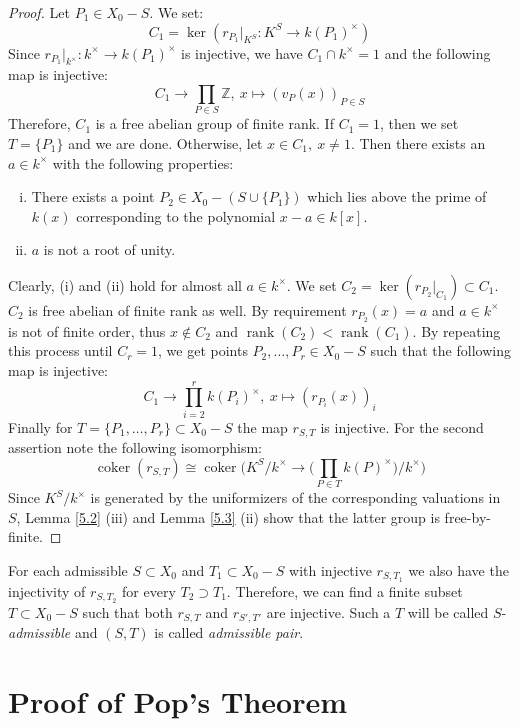 \begin{proof}
Let $P_1\in X_0-S$. We set:
\[ C_1 = \ker(r_{P_1}|_{K^S}: K^S \to k(P_1)^\times) \]
Since $r_{P_1}|_{k^\times}:k^\times \to k(P_1)^\times$ is injective, we have $C_1\cap k^\times = 1$ and the following map is injective:
\[ C_1 \to\prod_{P\in S}\mathbb{Z},\ x \mapsto (v_P(x))_{P\in S} \]
Therefore, $C_1$ is a free abelian group of finite rank. If $C_1 = 1$, then we set $T = \{P_1\}$ and we are done. Otherwise, let $x\in C_1,\ x\neq 1$. Then there exists an $a\in k^\times$ with the following properties:
\begin{enumerate}[(i)]
\item There exists a point $P_2\in X_0 - (S\cup\{P_1\})$ which lies above the prime of $k(x)$ corresponding to the polynomial $x-a\in k[x]$.
\item $a$ is not a root of unity.
\end{enumerate}
Clearly, (i) and (ii) hold for almost all $a\in k^\times$. We set $C_2 = \ker(r_{P_2}|_{C_1})\subset C_1$. $C_2$ is free abelian of finite rank as well. By requirement $r_{P_2}(x)=a$ and $a\in k^\times$ is not of finite order, thus $x\not\in C_2$ and $\operatorname{rank}(C_2) < \operatorname{rank}(C_1)$. By repeating this process until $C_r=1$, we get points $P_2,\ldots,P_r\in X_0-S$ such that the following map is injective:
\[ C_1\to\prod_{i=2}^{r} k(P_i)^\times,\ x\mapsto(r_{P_i}(x))_i \]
Finally for $T=\{P_1,\ldots,P_r\}\subset X_0-S$ the map $r_{S,T}$ is injective. For the second assertion note the following isomorphism:
\[ \operatorname{coker}(r_{S,T}) \cong\operatorname{coker}\Big(K^S/k^\times \to \Big(\prod_{P\in T}k(P)^\times \Big)\Big/k^\times \Big) \]
Since $K^S/k^\times$ is generated by the uniformizers of the corresponding valuations in $S$, Lemma \ref{5.2} (iii) and Lemma \ref{5.3} (ii) show that the latter group is free-by-finite.
\end{proof}

\begin{definition}
For each admissible $S\subset X_0$ and $T_1\subset X_0 -  S$ with injective $r_{S,T_1}$ we also have the injectivity of $r_{S,T_2}$ for every $T_2 \supset T_1$. Therefore,  we can find a finite subset $T\subset X_0 -  S$ such that both $r_{S,T}$ and $r_{S',T'}$ are injective. Such a $T$ will be called $S$-\textit{admissible} and $(S,T)$ is called \textit{admissible pair}.
\end{definition}

\section{Proof of Pop's Theorem}

